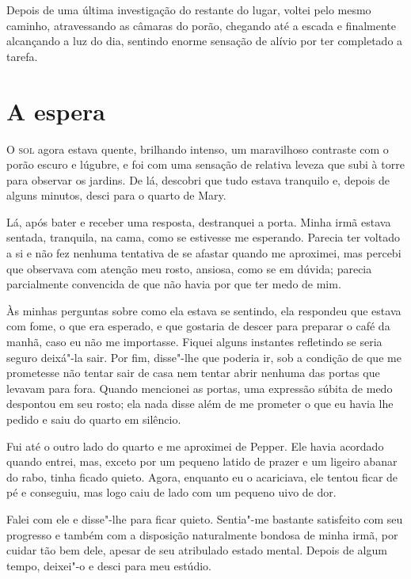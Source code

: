 Depois de uma última investigação do restante do lugar, voltei pelo mesmo caminho, atravessando as câmaras do
porão, chegando até a escada e finalmente alcançando a luz do dia, sentindo enorme sensação de alívio por ter
completado a tarefa.


\clearpage

\chapter{A espera}

\textsc{O sol} agora estava quente, brilhando intenso, um maravilhoso contraste com o porão escuro e lúgubre, e foi com uma
sensação de relativa leveza que subi à torre para observar os jardins. De lá, descobri que tudo estava tranquilo e,
depois de alguns minutos, desci para o quarto de Mary.

Lá, após bater e receber uma resposta, destranquei a porta. Minha irmã estava sentada, tranquila, na cama, como se
estivesse me esperando. Parecia ter voltado a si e não fez nenhuma tentativa de se afastar quando me aproximei, mas
percebi que observava com atenção meu rosto, ansiosa, como se em dúvida; parecia parcialmente convencida de que não
havia por que ter medo de mim.

Às minhas perguntas sobre como ela estava se sentindo, ela respondeu que estava com fome, o que era esperado, e que
gostaria de descer para preparar o café da manhã, caso eu não me importasse. Fiquei alguns instantes refletindo se
seria seguro deixá"-la sair. Por fim, disse"-lhe que poderia ir, sob a condição de que me prometesse não tentar sair
de casa nem tentar abrir nenhuma das portas que levavam para fora. Quando mencionei as portas, uma expressão súbita
de medo despontou em seu rosto; ela nada disse além de me prometer o que eu havia lhe pedido e saiu do
quarto em silêncio.

Fui até o outro lado do quarto e me aproximei de Pepper. Ele havia acordado quando entrei, mas, exceto por um pequeno
latido de prazer e um ligeiro abanar do rabo, tinha ficado quieto. Agora, enquanto eu o acariciava, ele tentou ficar de
pé e conseguiu, mas logo caiu de lado com um pequeno uivo de dor.

Falei com ele e disse"-lhe para ficar quieto. Sentia"-me bastante satisfeito com seu progresso e também com a disposição
naturalmente bondosa de minha irmã, por cuidar tão bem dele, apesar de seu atribulado estado mental. Depois de algum
tempo, deixei"-o e desci para meu estúdio.

